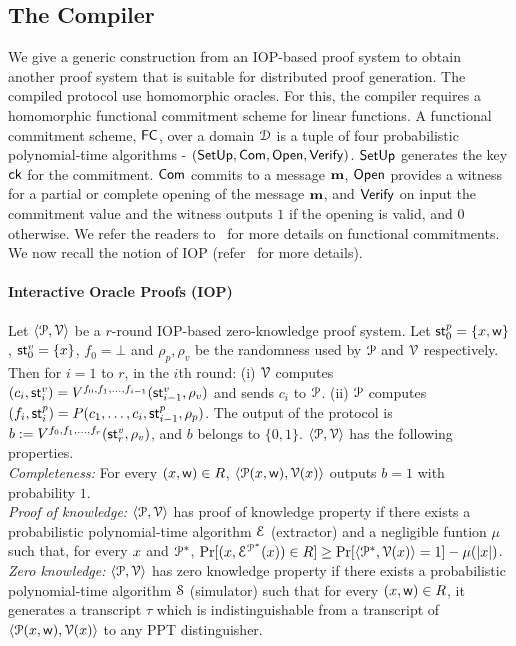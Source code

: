 \subsection{The Compiler}\label{sec:compiler_construction}
We give a generic construction from an IOP-based proof system to obtain another proof system that is suitable for distributed proof generation. The compiled protocol use homomorphic oracles. 
For this, the compiler requires a homomorphic functional commitment scheme for linear functions. A functional commitment scheme, $\mathsf{FC}$, over a domain $\mathcal{D}$ is a tuple of four probabilistic polynomial-time algorithms - $(\mathsf{SetUp}, \mathsf{Com}, \mathsf{Open}, \mathsf{Verify})$. $\mathsf{SetUp}$ generates the key $\mathsf{ck}$ for the commitment. $\mathsf{Com}$ commits to a message ${\bf m}$, $\mathsf{Open}$ provides a witness for a partial or complete opening of the message ${\bf m}$, and $\mathsf{Verify}$ on input the commitment value and the witness outputs $1$ if the opening is valid, and $0$ otherwise. We refer the readers to~\cite{functionalcom} for more details on functional commitments. We now recall the notion of IOP
(refer~\cite{BCS16} for more details).
\paragraph*{Interactive Oracle Proofs (IOP)} Let $\langle \mathcal{P},\mathcal{V}\rangle$ be a $r$-round IOP-based zero-knowledge proof system. Let $\mathsf{st}^p_0 = \{{x}, \mathsf{w}\}$, $\mathsf{st}^v_0 = \{{x}\}$, $f_0 = \bot$ and $\rho_p, \rho_v$ be the randomness used by $\mathcal{P}$ and $\mathcal{V}$ respectively.
Then for $i = 1$ to $r$, in the $i$th round: (i) $\mathcal{V}$ computes $(c_i,\mathsf{st}^v_i) = V^{f_0, f_1, \ldots, f_{i-1}}(\mathsf{st}^v_{i-1}, \rho_v)$ and sends $c_i$ to $\mathcal{P}$. 
(ii) $\mathcal{P}$ computes $(f_i, \mathsf{st}^p_i) = P(c_1, \ldots, c_i, \mathsf{st}^p_{i-1}, \rho_p)$.
The output of the protocol is $b := V^{f_0, f_1, \ldots, f_{r}}(\mathsf{st}^v_{r}, \rho_v)$, and $b$ belongs to $\{0,1\}$. $\langle \mathcal{P},\mathcal{V}\rangle$ has the following properties.\\
{\em Completeness:} For every $({x}, \mathsf{w}) \in R$, $\langle \mathcal{P}({x}, \mathsf{w}),\mathcal{V}({x})\rangle$ outputs $b = 1$ with probability $1$.\\
{\em Proof of knowledge:} $\langle \mathcal{P},\mathcal{V}\rangle$ has proof of knowledge property if there exists a probabilistic polynomial-time algorithm $\mathcal{E}$ (extractor) and a negligible funtion $\mu$ such that, for every ${x}$ and $\mathcal{P}^\ast$, $\Pr[({x}, \mathcal{E}^{\mathcal{P}^\ast}({x})) \in R] \geq \Pr[\langle \mathcal{P}^\ast,\mathcal{V}({x})\rangle = 1] - \mu(|{x}|)$.\\
{\em Zero knowledge:} $\langle \mathcal{P},\mathcal{V}\rangle$ has zero knowledge property if there exists a probabilistic polynomial-time algorithm $\mathcal{S}$ (simulator) such that for every $({x}, \mathsf{w}) \in R$, it generates a transcript $\tau$ which is indistinguishable from a transcript of $\langle \mathcal{P}({x}, \mathsf{w}),\mathcal{V}({x})\rangle$ to any PPT distinguisher.


